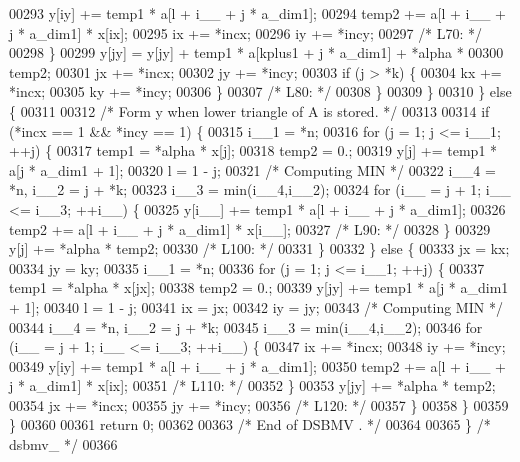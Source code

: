 \begin{DoxyCode}
00293             y[iy] += temp1 * a[l + i\_\_ + j * a\_dim1];
00294             temp2 += a[l + i\_\_ + j * a\_dim1] * x[ix];
00295             ix += *incx;
00296             iy += *incy;
00297 \textcolor{comment}{/* L70: */}
00298         \}
00299         y[jy] = y[jy] + temp1 * a[kplus1 + j * a\_dim1] + *alpha * 
00300             temp2;
00301         jx += *incx;
00302         jy += *incy;
00303         \textcolor{keywordflow}{if} (j > *k) \{
00304             kx += *incx;
00305             ky += *incy;
00306         \}
00307 \textcolor{comment}{/* L80: */}
00308         \}
00309     \}
00310     \} \textcolor{keywordflow}{else} \{
00311 
00312 \textcolor{comment}{/*        Form  y  when lower triangle of A is stored. */}
00313 
00314     \textcolor{keywordflow}{if} (*incx == 1 && *incy == 1) \{
00315         i\_\_1 = *n;
00316         \textcolor{keywordflow}{for} (j = 1; j <= i\_\_1; ++j) \{
00317         temp1 = *alpha * x[j];
00318         temp2 = 0.;
00319         y[j] += temp1 * a[j * a\_dim1 + 1];
00320         l = 1 - j;
00321 \textcolor{comment}{/* Computing MIN */}
00322         i\_\_4 = *n, i\_\_2 = j + *k;
00323         i\_\_3 = min(i\_\_4,i\_\_2);
00324         \textcolor{keywordflow}{for} (i\_\_ = j + 1; i\_\_ <= i\_\_3; ++i\_\_) \{
00325             y[i\_\_] += temp1 * a[l + i\_\_ + j * a\_dim1];
00326             temp2 += a[l + i\_\_ + j * a\_dim1] * x[i\_\_];
00327 \textcolor{comment}{/* L90: */}
00328         \}
00329         y[j] += *alpha * temp2;
00330 \textcolor{comment}{/* L100: */}
00331         \}
00332     \} \textcolor{keywordflow}{else} \{
00333         jx = kx;
00334         jy = ky;
00335         i\_\_1 = *n;
00336         \textcolor{keywordflow}{for} (j = 1; j <= i\_\_1; ++j) \{
00337         temp1 = *alpha * x[jx];
00338         temp2 = 0.;
00339         y[jy] += temp1 * a[j * a\_dim1 + 1];
00340         l = 1 - j;
00341         ix = jx;
00342         iy = jy;
00343 \textcolor{comment}{/* Computing MIN */}
00344         i\_\_4 = *n, i\_\_2 = j + *k;
00345         i\_\_3 = min(i\_\_4,i\_\_2);
00346         \textcolor{keywordflow}{for} (i\_\_ = j + 1; i\_\_ <= i\_\_3; ++i\_\_) \{
00347             ix += *incx;
00348             iy += *incy;
00349             y[iy] += temp1 * a[l + i\_\_ + j * a\_dim1];
00350             temp2 += a[l + i\_\_ + j * a\_dim1] * x[ix];
00351 \textcolor{comment}{/* L110: */}
00352         \}
00353         y[jy] += *alpha * temp2;
00354         jx += *incx;
00355         jy += *incy;
00356 \textcolor{comment}{/* L120: */}
00357         \}
00358     \}
00359     \}
00360 
00361     \textcolor{keywordflow}{return} 0;
00362 
00363 \textcolor{comment}{/*     End of DSBMV . */}
00364 
00365 \} \textcolor{comment}{/* dsbmv\_ */}
00366 
\end{DoxyCode}
